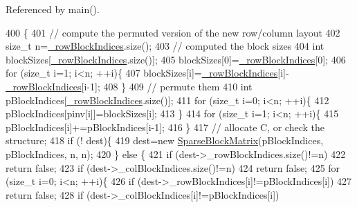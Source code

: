 Referenced by main().


\begin{DoxyCode}
400                                                                                                            
                                \{
401     \textcolor{comment}{// compute the permuted version of the new row/column layout}
402     \textcolor{keywordtype}{size\_t} n=\hyperlink{classg2o_1_1SparseBlockMatrix_ab0bd9c6d5b7b8704af1bc679032382e3}{\_rowBlockIndices}.size();
403     \textcolor{comment}{// computed the block sizes}
404     \textcolor{keywordtype}{int} blockSizes[\hyperlink{classg2o_1_1SparseBlockMatrix_ab0bd9c6d5b7b8704af1bc679032382e3}{\_rowBlockIndices}.size()];
405     blockSizes[0]=\hyperlink{classg2o_1_1SparseBlockMatrix_ab0bd9c6d5b7b8704af1bc679032382e3}{\_rowBlockIndices}[0];
406     \textcolor{keywordflow}{for} (\textcolor{keywordtype}{size\_t} i=1; i<n; ++i)\{
407       blockSizes[i]=\hyperlink{classg2o_1_1SparseBlockMatrix_ab0bd9c6d5b7b8704af1bc679032382e3}{\_rowBlockIndices}[i]-\hyperlink{classg2o_1_1SparseBlockMatrix_ab0bd9c6d5b7b8704af1bc679032382e3}{\_rowBlockIndices}[i-1];
408     \}
409     \textcolor{comment}{// permute them}
410     \textcolor{keywordtype}{int} pBlockIndices[\hyperlink{classg2o_1_1SparseBlockMatrix_ab0bd9c6d5b7b8704af1bc679032382e3}{\_rowBlockIndices}.size()];
411     \textcolor{keywordflow}{for} (\textcolor{keywordtype}{size\_t} i=0; i<n; ++i)\{
412       pBlockIndices[pinv[i]]=blockSizes[i];
413     \}
414     \textcolor{keywordflow}{for} (\textcolor{keywordtype}{size\_t} i=1; i<n; ++i)\{
415       pBlockIndices[i]+=pBlockIndices[i-1];
416     \}
417     \textcolor{comment}{// allocate C, or check the structure;}
418     \textcolor{keywordflow}{if} (! dest)\{
419       dest=\textcolor{keyword}{new} \hyperlink{classg2o_1_1SparseBlockMatrix_af9b8a9cb09a88bc444775a9974db8760}{SparseBlockMatrix}(pBlockIndices, pBlockIndices, n, n);
420     \} \textcolor{keywordflow}{else} \{
421       \textcolor{keywordflow}{if} (dest->\_rowBlockIndices.size()!=n)
422         \textcolor{keywordflow}{return} \textcolor{keyword}{false};
423       \textcolor{keywordflow}{if} (dest->\_colBlockIndices.size()!=n)
424         \textcolor{keywordflow}{return} \textcolor{keyword}{false};
425       \textcolor{keywordflow}{for} (\textcolor{keywordtype}{size\_t} i=0; i<n; ++i)\{
426         \textcolor{keywordflow}{if} (dest->\_rowBlockIndices[i]!=pBlockIndices[i])
427           \textcolor{keywordflow}{return} \textcolor{keyword}{false};
428         \textcolor{keywordflow}{if} (dest->\_colBlockIndices[i]!=pBlockIndices[i])

\end{DoxyCode}
